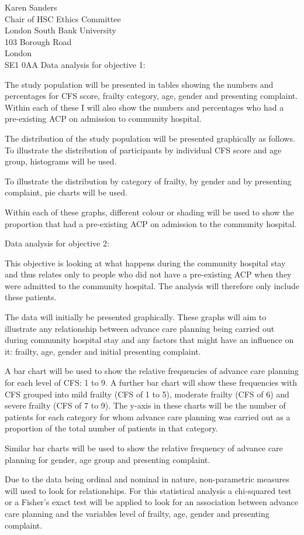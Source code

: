 \documentclass
[
	12pt,
	a4paper,
	oneside
]{letter}
\begin{document}
\begin{letter}{Karen Sanders\\
		Chair of HSC Ethics Committee\\
		London South Bank University\\
		103 Borough Road\\
		London\\
		SE1 0AA}
Data analysis for objective 1: 

The study population will be presented in tables showing the numbers and percentages
for CFS score, frailty category, age, gender and presenting complaint. Within each
of these I will also show the numbers and percentages who had a pre-existing ACP
on admission to community hospital.

The distribution of the study population will be presented graphically as follows.
To illustrate the distribution of participants by individual CFS score and age group,
histograms will be used. 

To illustrate the distribution by category of frailty, by gender and by presenting 
complaint, pie charts will be used.

Within each of these graphs, different colour or shading will be used to show
the proportion that had a pre-existing ACP on admission to the community hospital.

Data analysis for objective 2:

This objective is looking at what happens during the community hospital stay and 
thus relates only to people who did not have a pre-existing ACP when they
were admitted to the community hospital. The analysis will therefore only 
include these patients.

The data will initially be presented graphically. These graphs will aim to illustrate
any relationship between advance care planning being carried out during community
hospital stay and any factors that might have an 
influence on it: 
frailty, age, gender and initial presenting complaint.

A bar chart will be used to show the relative frequencies of advance care planning
for each level of CFS: 1 to 9. A further bar chart will show these frequencies with
CFS grouped into mild frailty (CFS of 1 to 5), moderate frailty (CFS of 6) and severe
frailty (CFS of 7 to 9). The y-axis in these charts will be the number of patients
for each category for whom advance care planning was carried out as a proportion of
the total number of patients in that category.  

Similar bar charts will be used to show the relative frequency of advance care
planning for gender, age group and presenting complaint.

Due to the data being ordinal and nominal in nature, non-parametric measures will
used to look for relationships. For this statistical analysis a chi-squared 
test or a Fisher's exact test will be applied to look for an association 
between advance care planning and the variables level of frailty, age, gender and 
presenting complaint.


\end{letter}
\end{document}
